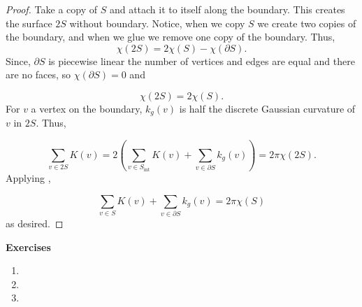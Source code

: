 \begin{proof}
Take a copy of $S$ and attach it to itself along the boundary.
This creates the surface $2S$ without boundary. Notice,
when we copy $S$ we create two copies of the boundary, and when
we glue we remove one copy of the boundary.
Thus, $$\chi(2S)=2\chi(S)-\chi(\partial S).$$
Since, $\partial S$ is piecewise linear the number of vertices and
edges are equal and there are no faces, so $\chi(\partial S)=0$
and 

\begin{equation} \label{eqn:glue}
\chi(2S)=2\chi(S).
\end{equation}
For $v$ a vertex on the boundary, $k_g(v)$ is half
the discrete Gaussian curvature of $v$ in $2S.$
Thus,

$$\sum_{v\in 2S}K(v)=2\left(\sum_{v\in S_{\text{int}}}K(v)+\sum_{v\in \partial S} k_g(v)\right) =2\pi  \chi(2S).$$
Applying ,

$$\sum_{v\in S}K(v)+\sum_{v\in \partial S} k_g(v)=2\pi  \chi(S)$$
as desired.

\end{proof}


\noindent \textbf{Exercises}


\begin{enumerate}
	\item 
	
	\item 
	
	\item 
	
\end{enumerate}

\pagebreak
